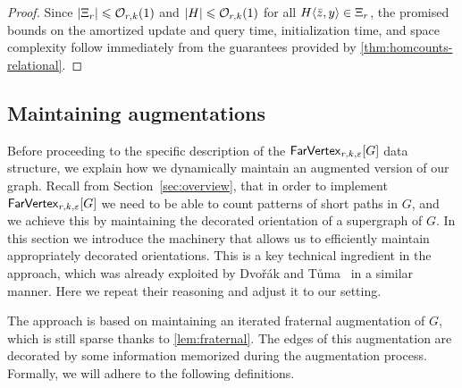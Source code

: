 \begin{proof}
	Since $|\Xi_{r}|\leq \Oh_{r,k}(1)$ and $|H|\leq \Oh_{r,k}(1)$ for all $\rt{H}{\tup z,y}\in \Xi_r$, the promised bounds on the amortized update and query time, initialization time, and space complexity follow immediately from the guarantees provided by \cref{thm:homcounts-relational}. 
\end{proof}

\subsection{Maintaining augmentations}\label{sec:augmentations}

Before proceeding to the specific description of the $\farVertexDS{G}{r,k,\eps}$ data structure, we explain how we dynamically maintain an augmented version of our graph.
Recall from Section~\ref{sec:overview}, that in order to
implement $\farVertexDS{G}{r,k,\eps}$ we need to be able to count patterns
of short paths in $G$, and we achieve this by maintaining the decorated orientation
of a supergraph of $G$. In this section we introduce the machinery that allows us to efficiently maintain
appropriately decorated orientations.
This is a key technical ingredient in the approach, which was already
exploited by Dvo\v{r}\'ak and T\r{u}ma~\cite{DvorakT13} in a similar
manner. Here we repeat their reasoning and adjust it to our setting.


The approach is based on maintaining an iterated fraternal augmentation of $G$, which is still sparse thanks to \cref{lem:fraternal}. The edges of this augmentation are decorated by some information memorized during the augmentation process. Formally, we will adhere to the following definitions.



